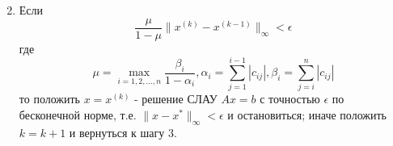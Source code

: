 \documentclass[a4paper, 12pt]{article}
\theoremstyle{definition}
\begin{document}
\begin{enumerate}
\begin{equation}
		\end{equation}
		\item Если
		\begin{equation} \label{stop_cond}
			\frac{\mu}{1-\mu}\|x^{(k)}-x^{(k-1)}\|_{\infty}<\epsilon
		\end{equation}
		где
		\begin{equation} \label{mu_num}
			\mu=\max\limits_{i=1,2,...,n}\frac{\beta_i}{1-\alpha_i}, \alpha_i=\sum\limits_{j=1}^{i-1}|c_{ij}|, \beta_i=\sum\limits_{j=i}^{n}|c_{ij}|
		\end{equation}
		то положить $x=x^{(k)}$ - решение СЛАУ $Ax=b$ с точностью $\epsilon$ по бесконечной норме, т.е. $\|x-x^*\|_{\infty}<\epsilon$ и остановиться; иначе положить $k=k+1$ и вернуться к шагу 3.
	\end{enumerate}
	
\end{document}
